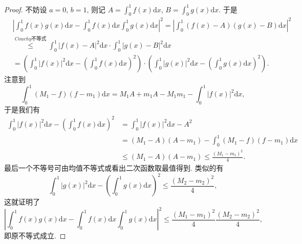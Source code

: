 \documentclass[../../main.tex]{subfiles}
\begin{document}
\begin{proof}
不妨设 $a = 0$, $b = 1$, 则记 $A = \int_{0}^{1}f(x)\mathrm{d}x$, $B = \int_{0}^{1}g(x)\mathrm{d}x$. 于是
\begin{align*}
&\left|\int_{0}^{1}f(x)g(x)\mathrm{d}x - \int_{0}^{1}f(x)\mathrm{d}x\int_{0}^{1}g(x)\mathrm{d}x\right|^2 = \left|\int_{0}^{1}(f(x) - A)(g(x) - B)\mathrm{d}x\right|^2
\\
&\stackrel{\hyperref[theorem:Cauchy不等式(一般版本)]{Cauchy\text{不等式}}}{\leqslant } \int_{0}^{1}|f(x) - A|^2\mathrm{d}x \cdot \int_{0}^{1}|g(x) - B|^2\mathrm{d}x
\\
&= \left(\int_{0}^{1}|f(x)|^2\mathrm{d}x - \left(\int_{0}^{1}f(x)\mathrm{d}x\right)^2\right) \cdot \left(\int_{0}^{1}|g(x)|^2\mathrm{d}x - \left(\int_{0}^{1}g(x)\mathrm{d}x\right)^2\right).
\end{align*}
注意到
\[
\int_{0}^{1}(M_1 - f)(f - m_1)\mathrm{d}x = M_1A + m_1A - M_1m_1 - \int_{0}^{1}|f(x)|^2\mathrm{d}x,
\]
于是我们有
\begin{align*}
\int_{0}^{1}|f(x)|^2\mathrm{d}x - \left(\int_{0}^{1}f(x)\mathrm{d}x\right)^2 &=\int_{0}^{1}|f(x)|^2\mathrm{d}x -A^2
\\
&= (M_1 - A)(A - m_1) - \int_{0}^{1}(M_1 - f)(f - m_1)\mathrm{d}x\\
&\leqslant  (M_1-A)(A-m_1)\leqslant  \frac{(M_1-m_1)^2}{4}.
\end{align*}
最后一个不等号可由均值不等式或看出二次函数取最值得到.
类似的有
\[
\int_{0}^{1}|g(x)|^2\mathrm{d}x - \left(\int_{0}^{1}g(x)\mathrm{d}x\right)^2 \leqslant  \frac{(M_2 - m_2)^2}{4},
\]
这就证明了
\[
\left|\int_{0}^{1}f(x)g(x)\mathrm{d}x - \int_{0}^{1}f(x)\mathrm{d}x\int_{0}^{1}g(x)\mathrm{d}x\right|^2 \leqslant  \frac{(M_1 - m_1)^2}{4}\frac{(M_2 - m_2)^2}{4},
\]
即原不等式成立. 
\end{proof}
\end{document}
